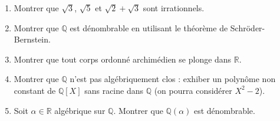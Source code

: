 \vspace{6pt}
\exolabel

\begin{mdframed}[style=exobar]
  \begin{enumerate}
    \item Montrer que $\sqrt{3}$, $\sqrt{5}$ et $\sqrt{2}+\sqrt{3}$ sont irrationnels.

    \item Montrer que $\mathbb{Q}$ est dénombrable en utilisant le théorème
          de Schröder-Bernstein.

    \item Montrer que tout corps ordonné archimédien se plonge dans $\mathbb{R}$.

    \item Montrer que $\mathbb{Q}$ n'est pas algébriquement clos : exhiber un
          polynôme non constant de $\mathbb{Q}[X]$ sans racine dans $\mathbb{Q}$
          (on pourra considérer $X^2 - 2$).

    \item Soit $\alpha \in \mathbb{R}$ algébrique sur $\mathbb{Q}$.
          Montrer que $\mathbb{Q}(\alpha)$ est dénombrable.
  \end{enumerate}
\end{mdframed}


